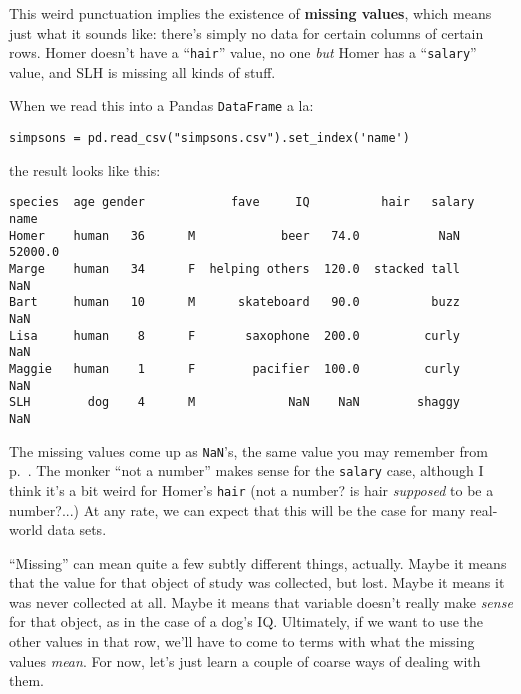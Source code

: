 
This weird punctuation implies the existence of \textbf{missing values}, which
means just what it sounds like: there's simply no data for certain columns of 
certain rows. Homer doesn't have a ``\texttt{hair}'' value, no one \textit{but}
Homer has a ``\texttt{salary}'' value, and SLH is missing all kinds of stuff.

When we read this into a Pandas \texttt{DataFrame} a la:

\begin{Verbatim}[fontsize=\small,samepage=true,frame=single,framesep=3mm]
simpsons = pd.read_csv("simpsons.csv").set_index('name')
\end{Verbatim}

the result looks like this:

\begin{Verbatim}[fontsize=\small,samepage=true,frame=leftline,framesep=5mm,framerule=1mm]
       species  age gender            fave     IQ          hair   salary
name                                                                    
Homer    human   36      M            beer   74.0           NaN  52000.0
Marge    human   34      F  helping others  120.0  stacked tall      NaN
Bart     human   10      M      skateboard   90.0          buzz      NaN
Lisa     human    8      F       saxophone  200.0         curly      NaN
Maggie   human    1      F        pacifier  100.0         curly      NaN
SLH        dog    4      M             NaN    NaN        shaggy      NaN
\end{Verbatim}


The missing values come up as \texttt{NaN}'s, the same value you may remember
from p.~\pageref{NaN}. The monker ``not a number'' makes sense for the
\texttt{salary} case, although I think it's a bit weird for Homer's
\texttt{hair} (not a number? is hair \textit{supposed} to be a number?...)
At any rate, we can expect that this will be the case for many real-world data
sets.


``Missing'' can mean quite a few subtly different things, actually. Maybe it
means that the value for that object of study was collected, but lost. Maybe it
means it was never collected at all. Maybe it means that variable doesn't
really make \textit{sense} for that object, as in the case of a dog's IQ.
Ultimately, if we want to use the other values in that row, we'll have to come
to terms with what the missing values \textit{mean}. For now, let's just learn
a couple of coarse ways of dealing with them.

